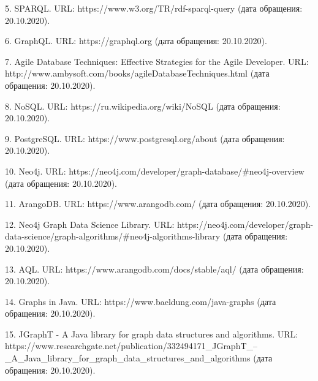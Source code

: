 5. SPARQL. URL: https://www.w3.org/TR/rdf-sparql-query (дата обращения: 20.10.2020).

6. GraphQL. URL: https://graphql.org (дата обращения: 20.10.2020).

7. Agile Database Techniques: Effective Strategies for the Agile Developer. URL: http://www.ambysoft.com/books/agileDatabaseTechniques.html (дата обращения: 20.10.2020).

8. NoSQL. URL: https://ru.wikipedia.org/wiki/NoSQL (дата обращения: 20.10.2020).

9. PostgreSQL. URL: https://www.postgresql.org/about (дата обращения: 20.10.2020).

10. Neo4j. URL: https://neo4j.com/developer/graph-database/#neo4j-overview (дата обращения: 20.10.2020).

11. ArangoDB. URL: https://www.arangodb.com/ (дата обращения: 20.10.2020).

12. Neo4j Graph Data Science Library. URL: https://neo4j.com/developer/graph-data-science/graph-algorithms/#neo4j-algorithms-library (дата обращения: 20.10.2020).

13. AQL. URL: https://www.arangodb.com/docs/stable/aql/ (дата обращения: 20.10.2020).

14. Graphs in Java. URL: https://www.baeldung.com/java-graphs (дата обращения: 20.10.2020).

15. JGraphT - A Java library for graph data structures and algorithms. URL: https://www.researchgate.net/publication/332494171\_JGraphT\_--\_A\_Java\_library\_for\_graph\_data\_structures\_and\_algorithms (дата обращения: 20.10.2020).
